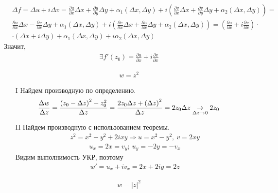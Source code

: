 \begin{itemize}
    \begin{align*}
      & \Delta f = \Delta u + i \Delta v = \frac{\partial u}{\partial x} \Delta x + \frac{\partial u}{\partial y} \Delta y + \alpha_1(\Delta x, \Delta y) + i \left( \frac{\partial v}{\partial x} \Delta x + \frac{\partial v}{\partial y} \Delta y + \alpha_2(\Delta x, \Delta y)\right) = \\
      & \frac{\partial u}{\partial x} \Delta x - \frac{\partial v}{\partial x} \Delta y + \alpha_1(\Delta x, \Delta y) + i \left( \frac{\partial v}{\partial x} \Delta x + \frac{\partial u}{\partial x} \Delta y + \alpha_2(\Delta x, \Delta y)\right) = \left( \frac{\partial u}{\partial x} + i \frac{\partial v}{\partial x}\right)\cdot \\
      & \cdot \left( \Delta x + i \Delta y \right)+ \alpha_1(\Delta x, \Delta y) + i \alpha_2(\Delta x, \Delta y)
    \end{align*}
    Значит,
    \begin{align*}
      & \exists f'(z_0) = \frac{\partial u}{\partial x} + i \frac{\partial v}{\partial x}
    \end{align*}
\end{itemize}
\Example
\begin{align*}
  & w = z^2
\end{align*}
\begin{itemize}
    \item[I] Найдем производную по определению.
    \begin{align*}
      & \frac{\Delta w}{\Delta z} = \frac{\left( z_0-\Delta z \right)^2 - z_0^2}{\Delta z} = \frac{2z_0\Delta z + \left( \Delta z \right)^2}{\Delta z} = 2z_0 \Delta z \underset{\Delta z \to 0}{\to} 2z_0
    \end{align*}
    \item[II] Найдем производную с использованием теоремы.
    \begin{align*}
      & z^2 = x^2-y^2+2ixy \Rightarrow u = x^2-y^2, \ v = 2xy
    \end{align*}
    \begin{align*}
      & u_x = 2x = v_y; \ u_y = -2y = - v_x
    \end{align*}
    Видим выполнимость УКР, поэтому
    \begin{align*}
      & w' = u_x+iv_x = 2x + 2iy = 2z
    \end{align*}
\end{itemize}
\Example
\begin{align*}
  & w = \left| z \right|^2
\end{align*}
